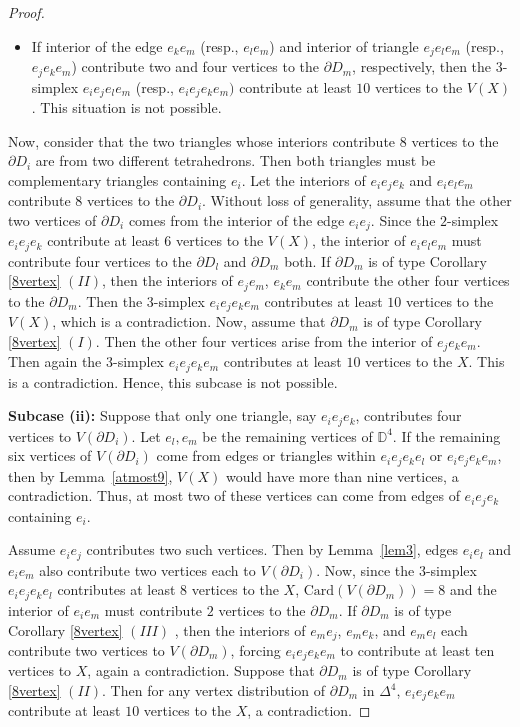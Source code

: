 \documentclass[11pt]{amsart}
\numberwithin{equation}{section}
\theoremstyle{definition}
\newcommand{\D}{\Delta}
\begin{document}
\begin{proof}
\begin{itemize}
\item If interior of the edge $e_ke_m$ (resp., $e_le_m$) and interior of triangle $e_je_le_m$ (resp., $e_je_ke_m$) contribute two and four vertices to the $\partial D_m$, respectively, then the $3$-simplex $e_ie_je_le_m$ (resp., $e_ie_je_ke_m)$ contribute at least $10$ vertices to the $V(X)$. This situation is not possible.

 
\end{itemize}

Now, consider that the two triangles whose interiors contribute $8$ vertices to the $\partial D_i$ are from two different tetrahedrons. Then both triangles must be complementary triangles containing $e_i$. Let the interiors of $e_ie_je_k$ and $e_ie_le_m$ contribute $8$ vertices to the $\partial D_i$. Without loss of generality, assume that the other two vertices of $\partial D_i$ comes from the interior of the edge $e_ie_j$. 
Since the $2$-simplex $e_ie_je_k$ contribute at least $6$ vertices to the $V(X)$, the  interior of $e_ie_le_m$ must contribute four vertices to the $\partial D_l$ and $\partial D_m$ both. If $\partial D_m$ is of type Corollary \ref{8vertex} $(II)$, then the interiors of $e_je_m$, $e_ke_m$ contribute the other four vertices to the $\partial D_m$. Then the $3$-simplex $e_ie_je_ke_m$ contributes at least $10$ vertices to the $V(X)$, which is a contradiction. Now, assume that $\partial D_m$ is of type Corollary \ref{8vertex} $(I)$. Then the other four vertices arise from the interior of $e_je_ke_m$. Then again the $3$-simplex $e_ie_je_ke_m$ contributes at least $10$ vertices to the $X$. This is a contradiction. Hence, this subcase is not possible.

\textbf{Subcase (ii):} Suppose that only one triangle, say $e_i e_j e_k$, contributes four vertices to $V(\partial D_i)$.  
Let $e_l, e_m$ be the remaining vertices of $\mathbb{D}^4$.  
If the remaining six vertices of $V(\partial D_i)$ come from edges or triangles within $e_i e_j e_k e_l$ or $e_i e_j e_k e_m$, then by Lemma~\ref{atmost9}, $V(X)$ would have more than nine vertices, a contradiction.  
Thus, at most two of these vertices can come from edges of $e_ie_je_k$ containing $e_i$.

Assume $e_i e_j$ contributes two such vertices.  
Then by Lemma~\ref{lem3}, edges $e_ie_l$ and $e_ie_m$ also contribute two vertices each to $V(\partial D_i)$. Now, since the $3$-simplex $e_ie_je_ke_l$ contributes at least $8$ vertices to the $X$, $\mathrm{Card}(V(\partial D_m)) = 8$ and the interior of $e_ie_m$ must contribute $2$ vertices to the $\partial D_m$.   
If $\partial D_m$ is of type Corollary \ref{8vertex} $(III)$ , then the interiors of $e_m e_j$, $e_m e_k$, and $e_m e_l$ each contribute two vertices to $V(\partial D_m)$, forcing $e_i e_j e_k e_m$ to contribute at least  ten vertices to $X$, again a contradiction.  
Suppose that $\partial D_m$ is of type Corollary \ref{8vertex} $(II)$. Then for any vertex distribution of $\partial D_m$ in $\D^4$, $e_ie_je_ke_m$ contribute at least $10$ vertices to the $X$, a contradiction.





\end{proof}
\end{document}
